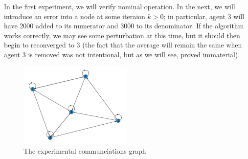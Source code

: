 \documentclass[11pt]{article}
\begin{document}
In the first experiment, we will verify nominal operation. In the next, we will introduce
an error into a node at some iteraion $k>0$; in particular, agent 3 will have 2000 added to its numerator
and 3000 to its denominator. If the algorithm works correctly, we may see some perturbation
at this time, but it should then begin to reconverged to 3 (the fact that the
average will remain the same when agent 3 is removed was not intentional, but as
we will see, proved immaterial).

\begin{figure}
    \centering
    \includegraphics[width=0.5\textwidth]{img/graph.png}
    \caption{The experimental communciations graph}
    \label{fig:graph}
\end{figure}
\end{document}

